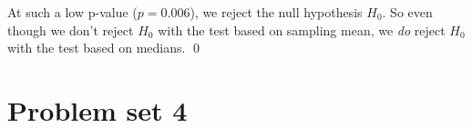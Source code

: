 \documentclass{book}
\theoremstyle{definition}
\begin{document}
At such a low p-value ($p = 0.006$), we reject the null hypothesis $H_0$. So even though we don't reject $H_0$ with the test based on sampling mean, we \textit{do} reject $H_0$ with the test based on medians. \qed


















\newpage



\section{Problem set 4}




	
	
\end{document}
